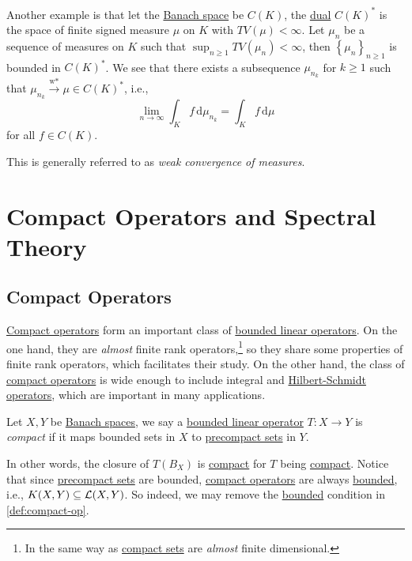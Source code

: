 Another example is that let the \hyperref[def:Banach-space]{Banach space} be \(C(K)\), the \hyperref[def:dual-space]{dual} \(C(K)^{\ast} \) is the space of finite signed measure \(\mu\) on \(K\) with \(TV(\mu )< \infty \). Let \(\mu _n\) be a sequence of measures on \(K\) such that \(\sup _{n\geq 1} TV(\mu _n) < \infty \), then \(\left\{ \mu _n \right\}_{n\geq 1} \) is bounded in \(C(K)^{\ast} \). We see that there exists a subsequence \(\mu _{n_k}\) for \(k\geq 1\) such that \(\mu _{n_k}\overset{\text{w*}}{\to } \mu \in C(K)^{\ast} \), i.e.,
\[
	\lim_{n \to \infty} \int _K f\,\mathrm{d} \mu _{n_k} = \int _K f\,\mathrm{d} \mu
\]
for all \(f\in C(K)\).

\begin{note}
	This is generally referred to as \emph{weak convergence of measures}.
\end{note}

\chapter{Compact Operators and Spectral Theory}

\section{Compact Operators}
\hyperref[def:compact-op]{Compact operators} form an important class of \hyperref[def:bounded-linear-op]{bounded linear operators}. On the one hand, they are \emph{almost} finite rank operators,\footnote{In the same way as \hyperref[def:compact]{compact sets} are \emph{almost} finite dimensional.} so they share some properties of finite rank operators, which facilitates their study. On the other hand, the class of \hyperref[def:compact-op]{compact operators} is wide enough to include integral and \hyperref[def:Hilbert-Schmidt-op]{Hilbert-Schmidt operators}, which are important in many applications.

\begin{definition}\label{def:compact-op}
	Let \(X, Y\) be \hyperref[def:Banach-space]{Banach spaces}, we say a \hyperref[def:bounded-linear-op]{bounded linear operator} \(T\colon X\to Y\) is \emph{compact} if it maps bounded sets in \(X\) to \hyperref[def:precompact]{precompact sets} in \(Y\).
\end{definition}

In other words, the closure of \(T(B_X)\) is \hyperref[def:compact]{compact} for \(T\) being \hyperref[def:compact-op]{compact}. Notice that since \hyperref[def:precompact]{precompact sets} are bounded, \hyperref[def:compact-op]{compact operators} are always \hyperref[def:bounded-map]{bounded}, i.e., \(K(X, Y)\subseteq \mathcal{\MakeUppercase{l}} (X, Y)\). So indeed, we may remove the \hyperref[def:bounded-map]{bounded} condition in \autoref{def:compact-op}.

